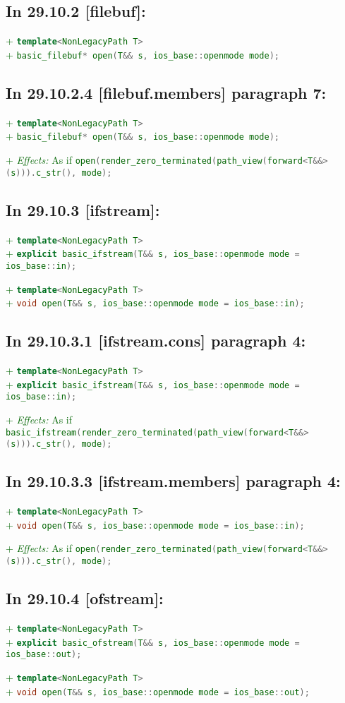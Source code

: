 \documentclass[11pt]{article}
\newcommand{\code}[2][cpp]{\lstinline[language=#1,basicstyle=\small\ttfamily]{#2}}
\newcommand{\desc}[1]{\textit{#1}}
\newcommand{\effects}{\desc{Effects: }}
\newcommand{\tsrefp}[3]{\subsection*{In #2 \textbf{[#1]} paragraph #3:}}
\newcommand{\tsref}[2]{\subsection*{In #2 \textbf{[#1]}:}}
\newcommand{\tsreplace}[3]{\textcolor{red}{\sout{#1}}#2\textcolor{darkgreen}{#3}}
\begin{document}
\tsref{filebuf}{29.10.2}

\tsreplace{}{}{+ \code{template<NonLegacyPath T>}}\\
\tsreplace{}{}{+ \code{basic_filebuf* open(T&& s, ios_base::openmode mode);}}

\tsrefp{filebuf.members}{29.10.2.4}{7}

\tsreplace{}{}{+ \code{template<NonLegacyPath T>}}\\
\tsreplace{}{}{+ \code{basic_filebuf* open(T&& s, ios_base::openmode mode);}}

\tsreplace{}{}{+ \effects As if \code{open(render_zero_terminated(path_view(forward<T&&>(s))).c_str(), mode);}}

\tsref{ifstream}{29.10.3}

\tsreplace{}{}{+ \code{template<NonLegacyPath T>}}\\
\tsreplace{}{}{+ \code{explicit basic_ifstream(T&& s,
ios_base::openmode mode = ios_base::in);}}

\tsreplace{}{}{+ \code{template<NonLegacyPath T>}}\\
\tsreplace{}{}{+ \code{void open(T&& s, ios_base::openmode mode = ios_base::in);}}

\tsrefp{ifstream.cons}{29.10.3.1}{4}

\tsreplace{}{}{+ \code{template<NonLegacyPath T>}}\\
\tsreplace{}{}{+ \code{explicit basic_ifstream(T&& s,
ios_base::openmode mode = ios_base::in);}}

\tsreplace{}{}{+ \effects As if \code{basic_ifstream(render_zero_terminated(path_view(forward<T&&>(s))).c_str(), mode);}}

\tsrefp{ifstream.members}{29.10.3.3}{4}

\tsreplace{}{}{+ \code{template<NonLegacyPath T>}}\\
\tsreplace{}{}{+ \code{void open(T&& s, ios_base::openmode mode = ios_base::in);}}

\tsreplace{}{}{+ \effects As if \code{open(render_zero_terminated(path_view(forward<T&&>(s))).c_str(), mode);}}


\tsref{ofstream}{29.10.4}

\tsreplace{}{}{+ \code{template<NonLegacyPath T>}}\\
\tsreplace{}{}{+ \code{explicit basic_ofstream(T&& s,
ios_base::openmode mode = ios_base::out);}}

\tsreplace{}{}{+ \code{template<NonLegacyPath T>}}\\
\tsreplace{}{}{+ \code{void open(T&& s, ios_base::openmode mode = ios_base::out);}}
\end{document}
